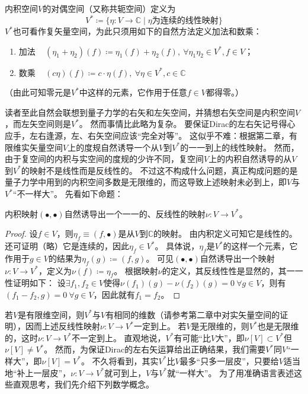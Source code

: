 \begin{definition}
    内积空间$V$的对偶空间（又称共轭空间）定义为
    $$V^* \coloneq \{\eta \colon V \to \mathbb{C} \mid \eta \text{为连续的线性映射}\}$$
    $V^*$也可看作复矢量空间，为此只须用如下的自然方法定义加法和数乘：
    \begin{enumerate}[]
        \item 加法 ~ $(\eta_1 + \eta_2)(f) \coloneq \eta_1(f) + \eta_2(f), ~ \forall \eta_1 \eta_2 \in V^*, f \in V$；
        \item 数乘 ~ $(c\eta)(f) \coloneq c \cdot \eta(f), ~ \forall \eta \in V^*, c \in \mathbb{C}$
    \end{enumerate}
    （由此可知零元是$V^*$中这样的元素，它作用于任意$f \in V$都得零。）
\end{definition}

读者至此自然会联想到量子力学的右矢和左矢空间，并猜想右矢空间是内积空间$V$，而左矢空间则是$V^*$。
然而事情比此略为复杂。
要保证Dirac的左右矢记号得心应手，左右逢源，左、右矢空间应该``完全对等''。
这似乎不难：根据第二章，有限维实矢量空间$V$上的度规自然诱导一个从$V$到$V^*$的一一到上的线性映射。
然而，由于复空间的内积与实空间的度规的少许不同，复空间$V$上的内积自然诱导的从$V$到$V^*$的映射不是线性而是反线性的。
不过这不构成什么问题，真正构成问题的是量子力学中用到的内积空间多数是无限维的，而这导致上述映射未必到上，即$V$与$V^*$``不一样大''。
先看如下命题：

\begin{theorem}
    内积映射$(\bullet,\bullet)$自然诱导出一个一一的、反线性的映射$\nu \colon V \to V^*$。
\end{theorem}

\begin{proof}
    设$f \in V$，则$\eta_f \equiv (f, \bullet)$是从$V$到$\mathbb{C}$的映射。
    由内积定义可知它是线性的。
    还可证明（略）它是连续的，因此$\eta_f \in V^*$。
    具体说，$\eta_f$是$V^*$的这样一个元素，它作用于$g \in V$的结果为$\eta_f(g) \coloneq (f, g)$。
    可见$(\bullet,\bullet)$自然诱导出一个映射$\nu \colon V \to V^*$，定义为$\nu(f) \coloneq \eta_f$。
    根据映射$\nu$的定义，其反线性性是显然的，其一一性证明如下：
    设$\exists f_1, f_2 \in V$使得$\nu(f_1)(g) - \nu(f_2)(g) = 0 ~ \forall g \in V$，则有$(f_1 - f_2, g) = 0 ~ \forall g \in V$，因此就有$f_1 = f_2$。
\end{proof}

若$V$是有限维空间，则$V^*$与$V$有相同的维数（请参考第二章中对实矢量空间的证明），因而上述反线性映射$\nu \colon V \to V^*$一定到上。
若$V$是无限维的，则$V^*$也是无限维的，这时$\nu \colon V \to V^*$不一定到上。
直观地说，$V^*$有可能``比$V$大''，即$\nu[V] \subset V^*$但$\nu[V] \neq V^*$。
然而，为保证Dirac的左右矢运算给出正确结果，我们需要$V^*$同$V$``一样大''，即$\nu[V] = V^*$。
不久将看到，其实$V^*$比$V$最多``只多一层皮''，只要给$V$适当地``补上一层皮''，$\nu \colon V \to V^*$就可到上，$V$与$V^*$就``一样大''。
为了用准确语言表述这些直观思考，我们先介绍下列数学概念。

